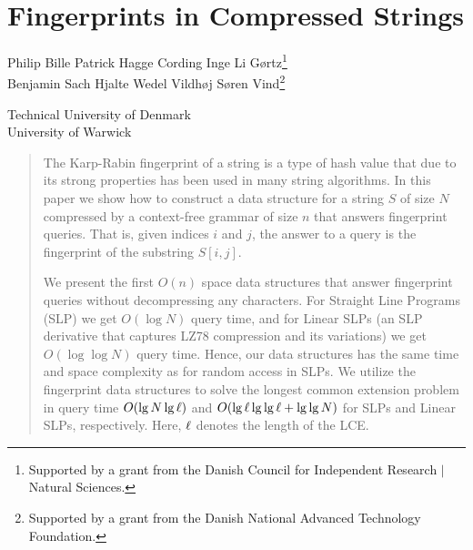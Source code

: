 
\chapter{Fingerprints in Compressed Strings}

\begin{infosection}
    \begin{authors}
        Philip Bille \qquad Patrick Hagge Cording \qquad Inge Li G{\o}rtz\footnote{Supported by a grant from the Danish Council for Independent Research $\vert$ Natural Sciences.}\\
        Benjamin Sach \qquad Hjalte Wedel Vildh{\o}j \qquad S{\o}ren Vind\footnote{Supported by a grant from the Danish National Advanced Technology Foundation.}
    \end{authors}

    \begin{uninames}
         Technical University of Denmark \\
         University of Warwick
    \end{uninames}

    \begin{abstract}
    The Karp-Rabin fingerprint of a string is a type of hash value that due to its strong properties has been used in many string algorithms. In this paper we show how to construct a data structure for a string $S$ of size $N$ compressed by a context-free grammar of size $n$ that answers fingerprint queries. That is, given indices $i$ and $j$, the answer to a query is the fingerprint of the substring $S[i,j]$. 
    
    We present the first $O(n)$ space data structures that answer fingerprint queries without decompressing any characters. For Straight Line Programs (SLP) we get $O(\log N)$ query time, and for Linear SLPs (an SLP derivative that captures LZ78 compression and its variations) we get $O(\log \log N)$ query time. Hence, our data structures has the same time and space complexity as for random access in SLPs. We utilize the fingerprint data structures to solve the longest common extension problem in query time $O(\lg N\lg \ell)$ and $O(\lg \ell \lg\lg \ell + \lg\lg N)$ for SLPs and Linear SLPs, respectively. Here, $\ell$ denotes the length of the LCE.
    \end{abstract}
\end{infosection}


